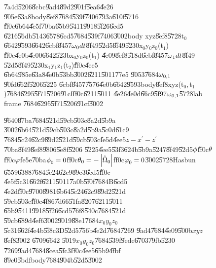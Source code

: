 \documentclass[12pt,a4paper]{article}
\begin{document}
\begin{figure}[th]
\caption{\U{7a4d}\U{5206}\U{8cbc}\U{9ad4}\U{89d2}\U{901f}\U{5ea6}\U{4e26}%
\U{905e}\U{63a8}body\U{8ef8}\U{7684}\U{539f}\U{7406}\U{793a}\U{610f}\U{5716}%
\U{ff0c}\U{6b64}\U{4e5f}\U{70ba}\U{65b9}\U{5411}\U{9918}\U{5f26}\U{6cd5}%
\U{6216}\U{56db}\U{5143}\U{6578}\U{6cd5}\U{7684}\U{539f}\U{7406}\U{3002}body
xyz\U{8ef8}\U{5728}t$_{0}$\U{6642}\U{9593}\U{6642}\U{6cbf}\U{8457}$\protect%
\omega _{0}dt$\U{8f49}\U{52d5}\U{8f49}\U{5230}x$_{0}$y$_{0}$z$_{0}$(t$_{1}$)%
\U{ff0c}\U{4e0b}\U{4e00}\U{6642}\U{523b}x$_{0}$y$_{0}$z$_{0}$(t$_{1}$)%
\U{4e09}\U{8ef8}\U{518d}\U{6cbf}\U{8457}$\protect\omega _{1}dt$\U{8f49}%
\U{52d5}\U{8f49}\U{5230}x$_{1}$y$_{1}$z$_{1}$(t$_{2}$)\U{ff0c}\U{4ee5}%
\U{6b64}\U{985e}\U{63a8}\U{4e0b}\U{53bb}\U{3002}\U{6211}\U{5011}\U{77e5}%
\U{9053}\U{7684}$\protect\omega _{0,1}$\U{90fd}\U{662f}\U{5206}\U{5225}%
\U{6cbf}\U{8457}\U{7576}\U{4e0b}\U{6642}\U{9593}body\U{8ef8}xyz(t$_{0},$t$%
_{1}$)\U{7684}\U{6295}\U{5f71}\U{5206}\U{91cf}\U{ff0c}\U{6211}\U{5011}%
\U{4e26}\U{4e0d}\U{66c9}\U{5f97}$\protect\omega _{0,1}$\U{5728}lab frame%
\U{7684}\U{6295}\U{5f71}\U{5206}\U{91cf}\U{3002}}
\begin{center}
\fbox{ }
\end{center}
\end{figure}

\begin{figure}[th]
\caption{\U{9640}\U{87ba}\U{7684}\U{521d}\U{59cb}\U{503c}\U{8a2d}\U{5b9a}%
\U{3002}\U{6b64}\U{521d}\U{59cb}\U{503c}\U{8a2d}\U{5b9a}\U{5c0d}\U{61c9}%
\U{7684}\U{5c24}\U{62c9}\U{89d2}\U{521d}\U{59cb}\U{503c}\U{fe5d}\U{4ee5}$%
z-x^{\prime }-z^{\prime }$\U{70ba}\U{8f49}\U{8ef8}\U{9806}\U{5e8f}\U{5206}%
\U{5225}\U{4ee5}\U{53f3}\U{624b}\U{5b9a}\U{5247}\U{8f49}\U{52d5}$\protect%
\phi $\U{ff0c}$\protect\theta $\U{ff0c}$\protect\varphi $\U{fe5e}\U{70ba}$%
\protect\phi _{0}=0$\U{ff0c}$\protect\theta _{0}=-\left\vert \hat{\Omega}%
_{0}\right\vert $\U{ff0c}$\protect\varphi _{0}=0$\U{3002}\U{5728}Hasbun%
\U{6559}\U{6388}\U{7684}\U{5c24}\U{62c9}\U{89e3}\U{6cd5}\thinspace \U{ff0c}%
\U{4e5f}\U{5c31}\U{662f}\U{6211}\U{5011}\U{7a0b}\U{5f0f}\U{7684}B\U{6cd5}%
\U{4e2d}\U{ff0c}\U{9700}\U{8981}\U{6b64}\U{5c24}\U{62c9}\U{89d2}\U{521d}%
\U{59cb}\U{503c}\U{ff0c}\U{4f86}\U{7d66}\U{51fa}\U{8207}\U{6211}\U{5011}%
\U{65b9}\U{5411}\U{9918}\U{5f26}\U{6cd5}\U{76f8}\U{540c}\U{7684}\U{521d}%
\U{59cb}\U{689d}\U{4ef6}\U{3002}\U{9019}\U{88e1}\U{7684}$x_{0}y_{0}z_{0}$%
\U{5c31}\U{662f}\U{4e4b}\U{5f8c}3D\U{52d5}\U{756b}\U{4e2d}\U{7684}\U{7269}%
\U{9ad4}\U{7684}\U{4e09}\U{500b}$xyz$\U{8ef8}\U{3002} \U{6709}\U{6642}%
\U{5019}$x_{0}y_{0}z_{0}$\U{7684}\U{539f}\U{9ede}\U{6703}\U{79fb}\U{5230}%
\U{7269}\U{9ad4}\U{7684}\U{8cea}\U{5fc3}\U{ff0c}\U{4ee5}\U{65b9}\U{4fbf}%
\U{89c0}\U{5bdf}body\U{7684}\U{904b}\U{52d5}\U{3002}}
\label{xyz_init_orien}
\begin{center}
\fbox{}
\end{center}
\end{figure}
\end{document}
